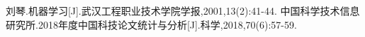 \begin{citelist}
    刘琴.机器学习[J].武汉工程职业技术学院学报,2001,13(2):41-44.
    中国科学技术信息研究所.2018年度中国科技论文统计与分析[J].科学,2018,70(6):57-59.
\end{citelist}